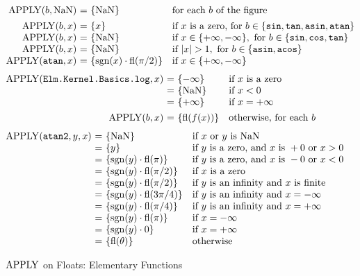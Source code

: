 \begin{figure}[htbp]
\centering
\small
\[
\begin{array}{@{}r@{\ }c@{\ }l@{\quad}l@{}}
\APPLY(b,\dbNaN) & = & \{\dbNaN\} & \text{for each}\ b\ \text{of the figure}\\[1ex]
\APPLY(b,x) & = & \{x\} & \text{if}\ x\ \text{is a zero, for}\ b\in\{\kw{sin},\kw{tan},\kw{asin},\kw{atan}\}\\
\APPLY(b,x) & = & \{\dbNaN\} & \text{if}\ x\in\{+\infty,-\infty\},\ \text{for}\ b\in\{\kw{sin},\kw{cos},\kw{tan}\}\\
\APPLY(b,x) & = & \{\dbNaN\} & \text{if}\ |x|>1,\ \text{for}\ b\in\{\kw{asin},\kw{acos}\}\\
\APPLY(\kw{atan},x) & = & \{\dbsgn(x)\cdot\dbfl(\dbpinum/2)\} & \text{if}\ x\in\{+\infty,-\infty\}
\end{array}
\]
\[
\begin{array}{@{}r@{\ }c@{\ }l@{\quad}l@{}}
\APPLY(\kw{Elm.Kernel.Basics.log},x) & = & \{-\infty\} & \text{if}\ x\ \text{is a zero}\\
  & = & \{\dbNaN\} & \text{if}\ x<0\\
  & = & \{+\infty\} & \text{if}\ x=+\infty\\[1ex]
\APPLY(b,x) & = & \{\dbfl(f(x))\} & \text{otherwise, for each}\ b
\end{array}
\]
\[
\begin{array}{@{}r@{\ }c@{\ }l@{\quad}l@{}}
\APPLY(\kw{atan2},y,x) & = & \{\dbNaN\} & \text{if}\ x\ \text{or}\ y\ \text{is}\ \dbNaN\\
  & = & \{y\} & \text{if}\ y\ \text{is a zero, and}\ x\ \text{is}\ +0\ \text{or}\ x>0\\
  & = & \{\dbsgn(y)\cdot\dbfl(\dbpinum)\} & \text{if}\ y\ \text{is a zero, and}\ x\ \text{is}\ -0\ \text{or}\ x<0\\
  & = & \{\dbsgn(y)\cdot\dbfl(\dbpinum/2)\} & \text{if}\ x\ \text{is a zero}\\
  & = & \{\dbsgn(y)\cdot\dbfl(\dbpinum/2)\} & \text{if}\ y\ \text{is an infinity and}\ x\ \text{is finite}\\
  & = & \{\dbsgn(y)\cdot\dbfl(3\dbpinum/4)\} & \text{if}\ y\ \text{is an infinity and}\ x=-\infty\\
  & = & \{\dbsgn(y)\cdot\dbfl(\dbpinum/4)\} & \text{if}\ y\ \text{is an infinity and}\ x=+\infty\\
  & = & \{\dbsgn(y)\cdot\dbfl(\dbpinum)\} & \text{if}\ x=-\infty\\
  & = & \{\dbsgn(y)\cdot 0\} & \text{if}\ x=+\infty\\
  & = & \{\dbfl(\theta)\} & \text{otherwise}
\end{array}
\]
\caption{$\mathrm{APPLY}$ on Floats: Elementary Functions}\label{fig:dynamic-basis-elem}
\end{figure}

